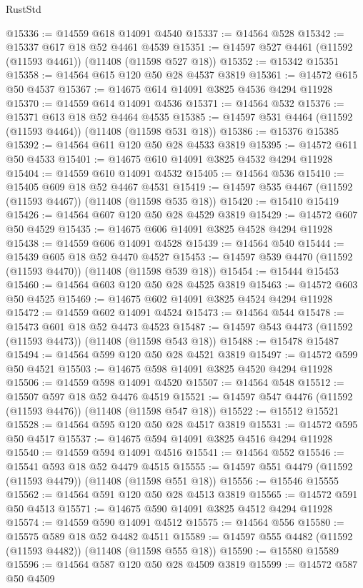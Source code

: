 \begin{lexlean}{RustStd}
\begin{coremodule}
@15336 := @14559 @618 @14091 @4540
@15337 := @14564 @528
@15342 := @15337 @617 @18 @52 @4461 @4539
@15351 := @14597 @527 @4461 (@11592 (@11593 @4461)) (@11408 (@11598 @527 @18))
@15352 := @15342 @15351
@15358 := @14564 @615 @120 @50 @28 @4537 @3819
@15361 := @14572 @615 @50 @4537
@15367 := @14675 @614 @14091 @3825 @4536 @4294 @11928
@15370 := @14559 @614 @14091 @4536
@15371 := @14564 @532
@15376 := @15371 @613 @18 @52 @4464 @4535
@15385 := @14597 @531 @4464 (@11592 (@11593 @4464)) (@11408 (@11598 @531 @18))
@15386 := @15376 @15385
@15392 := @14564 @611 @120 @50 @28 @4533 @3819
@15395 := @14572 @611 @50 @4533
@15401 := @14675 @610 @14091 @3825 @4532 @4294 @11928
@15404 := @14559 @610 @14091 @4532
@15405 := @14564 @536
@15410 := @15405 @609 @18 @52 @4467 @4531
@15419 := @14597 @535 @4467 (@11592 (@11593 @4467)) (@11408 (@11598 @535 @18))
@15420 := @15410 @15419
@15426 := @14564 @607 @120 @50 @28 @4529 @3819
@15429 := @14572 @607 @50 @4529
@15435 := @14675 @606 @14091 @3825 @4528 @4294 @11928
@15438 := @14559 @606 @14091 @4528
@15439 := @14564 @540
@15444 := @15439 @605 @18 @52 @4470 @4527
@15453 := @14597 @539 @4470 (@11592 (@11593 @4470)) (@11408 (@11598 @539 @18))
@15454 := @15444 @15453
@15460 := @14564 @603 @120 @50 @28 @4525 @3819
@15463 := @14572 @603 @50 @4525
@15469 := @14675 @602 @14091 @3825 @4524 @4294 @11928
@15472 := @14559 @602 @14091 @4524
@15473 := @14564 @544
@15478 := @15473 @601 @18 @52 @4473 @4523
@15487 := @14597 @543 @4473 (@11592 (@11593 @4473)) (@11408 (@11598 @543 @18))
@15488 := @15478 @15487
@15494 := @14564 @599 @120 @50 @28 @4521 @3819
@15497 := @14572 @599 @50 @4521
@15503 := @14675 @598 @14091 @3825 @4520 @4294 @11928
@15506 := @14559 @598 @14091 @4520
@15507 := @14564 @548
@15512 := @15507 @597 @18 @52 @4476 @4519
@15521 := @14597 @547 @4476 (@11592 (@11593 @4476)) (@11408 (@11598 @547 @18))
@15522 := @15512 @15521
@15528 := @14564 @595 @120 @50 @28 @4517 @3819
@15531 := @14572 @595 @50 @4517
@15537 := @14675 @594 @14091 @3825 @4516 @4294 @11928
@15540 := @14559 @594 @14091 @4516
@15541 := @14564 @552
@15546 := @15541 @593 @18 @52 @4479 @4515
@15555 := @14597 @551 @4479 (@11592 (@11593 @4479)) (@11408 (@11598 @551 @18))
@15556 := @15546 @15555
@15562 := @14564 @591 @120 @50 @28 @4513 @3819
@15565 := @14572 @591 @50 @4513
@15571 := @14675 @590 @14091 @3825 @4512 @4294 @11928
@15574 := @14559 @590 @14091 @4512
@15575 := @14564 @556
@15580 := @15575 @589 @18 @52 @4482 @4511
@15589 := @14597 @555 @4482 (@11592 (@11593 @4482)) (@11408 (@11598 @555 @18))
@15590 := @15580 @15589
@15596 := @14564 @587 @120 @50 @28 @4509 @3819
@15599 := @14572 @587 @50 @4509

\end{coremodule}
\end{lexlean}
